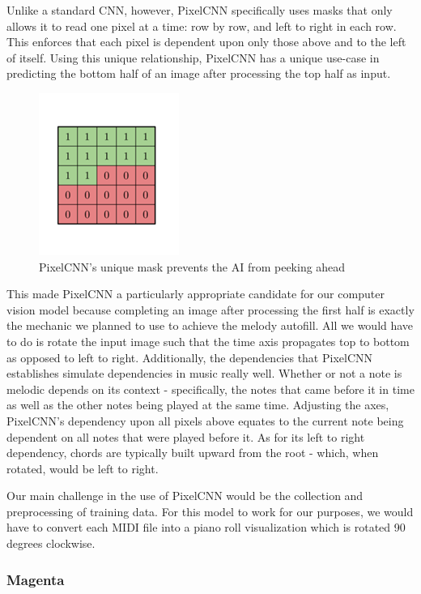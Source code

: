 Unlike a standard CNN, however, PixelCNN specifically uses masks that only allows it to read
one pixel at a time: row by row, and left to right in each row. This enforces that each pixel
is dependent upon only those above and to the left of itself. Using this unique relationship,
PixelCNN has a unique use-case in predicting the bottom half of an image after processing the
top half as input.

\begin{figure}[h!]
  \centering
  \includegraphics{image/PixelMask.png}
  \caption{PixelCNN's unique mask prevents the AI from peeking ahead}
  \label{fig:pixel_mask}
\end{figure}

This made PixelCNN a particularly appropriate candidate for our computer vision model because
completing an image after processing the first half is exactly the mechanic we planned to use
to achieve the melody autofill. All we would have to do is rotate the input image such that
the time axis propagates top to bottom as opposed to left to right. Additionally, the
dependencies that PixelCNN establishes simulate dependencies in music really well. Whether or
not a note is melodic depends on its context - specifically, the notes that came before it in
time as well as the other notes being played at the same time. Adjusting the axes, PixelCNN's
dependency upon all pixels above equates to the current note being dependent on all notes
that were played before it. As for its left to right dependency, chords are typically built
upward from the root - which, when rotated, would be left to right.

Our main challenge in the use of PixelCNN would be the collection and preprocessing of
training data. For this model to work for our purposes, we would have to convert each MIDI
file into a piano roll visualization which is rotated 90 degrees clockwise.

\subsubsection{Magenta}


